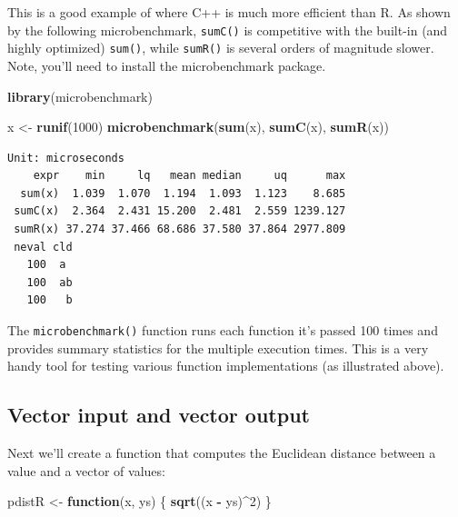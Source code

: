 \documentclass[
]{krantz}
\makeatletter
\newenvironment{Shaded}{\begin{snugshade}}{\end{snugshade}}
\newcommand{\ControlFlowTok}[1]{\textcolor[rgb]{0.27,0.27,0.27}{\textbf{#1}}}
\newcommand{\DecValTok}[1]{\textcolor[rgb]{0.06,0.06,0.06}{#1}}
\newcommand{\KeywordTok}[1]{\textcolor[rgb]{0.27,0.27,0.27}{\textbf{#1}}}
\newcommand{\NormalTok}[1]{#1}
\newcommand{\OperatorTok}[1]{\textcolor[rgb]{0.43,0.43,0.43}{\textbf{#1}}}
\newcommand{\StringTok}[1]{\textcolor[rgb]{0.5,0.5,0.5}{#1}}
\newenvironment{kframe}{%
\medskip{}
\setlength{\fboxsep}{.8em}
 \def\at@end@of@kframe{}%
 \ifinner\ifhmode%
  \def\at@end@of@kframe{\end{minipage}}%
  \begin{minipage}{\columnwidth}%
 \fi\fi%
 \def\FrameCommand##1{\hskip\@totalleftmargin \hskip-\fboxsep
 \colorbox{shadecolor}{##1}\hskip-\fboxsep
     \hskip-\linewidth \hskip-\@totalleftmargin \hskip\columnwidth}%
 \MakeFramed {\advance\hsize-\width
   \@totalleftmargin\z@ \linewidth\hsize
   \@setminipage}}%
 {\par\unskip\endMakeFramed%
 \at@end@of@kframe}
\renewenvironment{Shaded}{\begin{kframe}}{\end{kframe}}
\makeatother
\begin{document}
This is a good example of where C++ is much more efficient than R. As shown by the following microbenchmark, \texttt{sumC()} is competitive with the built-in (and highly optimized) \texttt{sum()}, while \texttt{sumR()} is several orders of magnitude slower. Note, you'll need to install the microbenchmark package.

\begin{Shaded}
\begin{Highlighting}[]
\KeywordTok{library}\NormalTok{(microbenchmark)}

\NormalTok{x \textless{}{-}}\StringTok{ }\KeywordTok{runif}\NormalTok{(}\DecValTok{1000}\NormalTok{)}
\KeywordTok{microbenchmark}\NormalTok{(}\KeywordTok{sum}\NormalTok{(x), }\KeywordTok{sumC}\NormalTok{(x), }\KeywordTok{sumR}\NormalTok{(x))}
\end{Highlighting}
\end{Shaded}

\begin{verbatim}
Unit: microseconds
    expr    min     lq   mean median     uq      max
  sum(x)  1.039  1.070  1.194  1.093  1.123    8.685
 sumC(x)  2.364  2.431 15.200  2.481  2.559 1239.127
 sumR(x) 37.274 37.466 68.686 37.580 37.864 2977.809
 neval cld
   100  a 
   100  ab
   100   b
\end{verbatim}

The \texttt{microbenchmark()} function runs each function it's passed 100 times and provides summary statistics for the multiple execution times. This is a very handy tool for testing various function implementations (as illustrated above).

\hypertarget{vector-input-and-vector-output}{%
\subsection{Vector input and vector output}\label{vector-input-and-vector-output}}

Next we'll create a function that computes the Euclidean distance between a value and a vector of values:

\begin{Shaded}
\begin{Highlighting}[]
\NormalTok{pdistR \textless{}{-}}\StringTok{ }\ControlFlowTok{function}\NormalTok{(x, ys) \{}
    \KeywordTok{sqrt}\NormalTok{((x }\OperatorTok{{-}}\StringTok{ }\NormalTok{ys)}\OperatorTok{\^{}}\DecValTok{2}\NormalTok{)}
\NormalTok{\}}
\end{Highlighting}
\end{Shaded}
\end{document}
